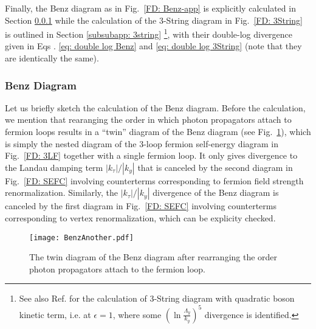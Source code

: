 \documentclass[prx,amsmath,amssymb, notitlepage, onecolumn,
nofootinbib,
superscriptaddress,
longbibliography
]{revtex4-1}
\begin{document}
Finally, the Benz diagram as in Fig.~\ref{FD: Benz-app} is explicitly calculated in Section \ref{subsubapp: Benz} while the calculation of the 3-String diagram in Fig.~\ref{FD: 3String} is   outlined in Section \ref{subsubapp: 3string} \footnote{See also Ref. \cite{Holder2015} for the calculation of 3-String diagram with quadratic boson kinetic term, i.e. at $\epsilon=1$, where some $(\ln\frac{\Lambda_y}{k_y})^5$ divergence is identified.}, with their double-log divergence given in Eqs
. \eqref{eq: double log Benz} and \eqref{eq: double log 3String} (note that they are identically the same).

\subsubsection{Benz Diagram}\label{subsubapp: Benz}

Let us briefly sketch the calculation of the Benz diagram. 
Before the calculation, we mention that rearanging the order in which photon propagators attach to fermion loops results in a ``twin'' diagram of the Benz diagram (see Fig.~\ref{FD: BenzTwin}), which is simply the nested diagram of the 3-loop fermion self-energy diagram in Fig.~\ref{FD: 3LF} together with a single fermion loop. 
It only gives divergence to the Landau damping term $|k_\tau|/|k_y|$ that is canceled by the second diagram in Fig.~\ref{FD: SEFC} involving counterterms corresponding to fermion field strength renormalization. Similarly, the $|k_\tau|/|k_y|$ divergence of the Benz diagram is canceled by the first diagram in Fig.~\ref{FD: SEFC} involving counterterms corresponding to vertex renormalization, which can be explicity checked.

\begin{figure}[h]
\begin{center}
\texttt{[image: BenzAnother.pdf]}
\end{center}
\caption{The twin diagram of the Benz diagram after rearranging the order photon propagators attach to the fermion loop.} 
\label{FD: BenzTwin}
\end{figure}
\end{document}
